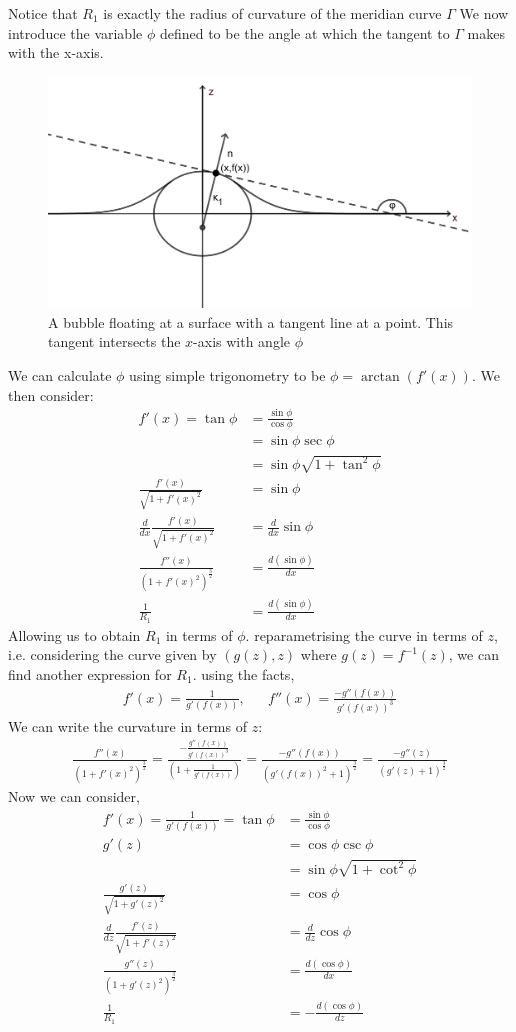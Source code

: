 Notice that $R_1$ is exactly the radius of curvature of the meridian curve $\Gamma$
We now introduce the variable $\phi$ defined to be the angle at which the tangent to $\Gamma$ makes with the x-axis. 
\begin{figure}[hb]
    \centering
    \includegraphics[width=0.55\linewidth]{WriteUp/images/tangent to bubble extra.png}
    \caption{A bubble floating at a surface with a tangent line at a point. This tangent intersects the $x$-axis with angle $\phi$}
    \label{fig:3}
\end{figure}
We can calculate $\phi$ using simple trigonometry to be $\phi=\arctan(f'(x))$. We then consider:
\begin{align}
    f'(x)=\tan \phi &= \frac{\sin\phi}{\cos\phi} \\
    &=\sin\phi\sec\phi \\
    &=\sin\phi \sqrt{1+\tan^2\phi}\\
    \frac{f'(x)}{\sqrt{1+f'(x)^2}}&=\sin\phi\\
    \frac{d}{dx} \frac{f'(x)}{\sqrt{1+f'(x)^2}}&=\frac{d}{dx}\sin\phi \\
    \frac{f''(x)}{(1+f'(x)^2)^{\frac{3}{2}}}&=\frac{d(\sin\phi)}{dx} \\
    \frac{1}{R_1}&=\frac{d(\sin\phi)}{dx}
\end{align}
Allowing us to obtain $R_1$ in terms of $\phi$. reparametrising the curve in terms of $z$, i.e. considering the curve given by $(g(z),z)$ where $g(z)=f^{-1}(z)$, we can find another expression for $R_1$. using the facts,
\begin{align}
    f'(x)=\frac{1}{g'(f(x))}, && f''(x) = \frac{-g''(f(x))}{g'(f(x))^3}
\end{align}
We can write the curvature in terms of $z$:
\begin{align}
    \frac{f''(x)}{(1+f'(x)^2)^{\frac{3}{2}}}=\frac{-\frac{g''(f(x))}{g'(f(x))^3}}{(1+\frac{1}{g'(f(x))})} = \frac{-g''(f(x))}{(g'(f(x))^2+1)^{\frac{3}{2}}} = \frac{-g''(z)}{(g'(z)+1)^{\frac{3}{2}}}
\end{align}
Now we can consider,
\begin{align}
    f'(x)=\frac{1}{g'(f(x))}=\tan \phi &= \frac{\sin\phi}{\cos\phi} \\
    g'(z)&=\cos\phi\csc\phi \\
    &=\sin\phi \sqrt{1+\cot^2\phi}\\
    \frac{g'(z)}{\sqrt{1+g'(z)^2}}&=\cos\phi\\
    \frac{d}{dz} \frac{f'(z)}{\sqrt{1+f'(z)^2}}&=\frac{d}{dz}\cos\phi \\
    \frac{g''(z)}{(1+g'(z)^2)^{\frac{3}{2}}}&=\frac{d(\cos\phi)}{dx} \\
    \frac{1}{R_1}&=-\frac{d(\cos\phi)}{dz}
\end{align}
